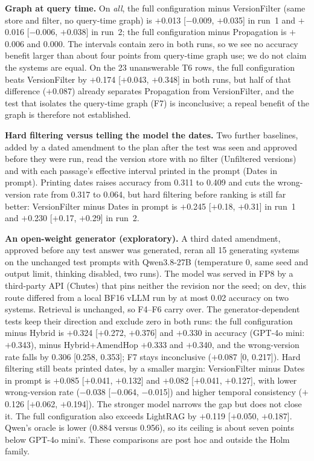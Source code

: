 \documentclass[conference]{IEEEtran}
\newcommand{\sys}[1]{\textsf{#1}}
\begin{document}
\textbf{Graph at query time.} On \textit{all}, the full configuration minus \sys{VersionFilter} (same store and filter, no query-time graph) is $+$0.013 [$-$0.009, $+$0.035] in run~1 and $+$0.016 [$-$0.006, $+$0.038] in run~2; the full configuration minus \sys{Propagation} is $+$0.006 and 0.000. The intervals contain zero in both runs, so we see no accuracy benefit larger than about four points from query-time graph use; we do not claim the systems are equal. On the 23 unanswerable T6 rows, the full configuration beats \sys{VersionFilter} by $+$0.174 [$+$0.043, $+$0.348] in both runs, but half of that difference ($+$0.087) already separates \sys{Propagation} from \sys{VersionFilter}, and the test that isolates the query-time graph (F7) is inconclusive; a repeal benefit of the graph is therefore not established.

\textbf{Hard filtering versus telling the model the dates.} Two further baselines, added by a dated amendment to the plan after the test was seen and approved before they were run, read the version store with no filter (\sys{Unfiltered versions}) and with each passage's effective interval printed in the prompt (\sys{Dates in prompt}). Printing dates raises accuracy from 0.311 to 0.409 and cuts the wrong-version rate from 0.317 to 0.064, but hard filtering before ranking is still far better: \sys{VersionFilter} minus \sys{Dates in prompt} is $+$0.245 [$+$0.18, $+$0.31] in run~1 and $+$0.230 [$+$0.17, $+$0.29] in run~2.

\textbf{An open-weight generator (exploratory).}\label{sec:qwen} A third dated amendment, approved before any test answer was generated, reran all 15 generating systems on the unchanged test prompts with Qwen3.8-27B (temperature 0, same seed and output limit, thinking disabled, two runs). The model was served in FP8 by a third-party API (Chutes) that pins neither the revision nor the seed; on dev, this route differed from a local BF16 vLLM run by at most 0.02 accuracy on two systems. Retrieval is unchanged, so F4--F6 carry over. The generator-dependent tests keep their direction and exclude zero in both runs: the full configuration minus \sys{Hybrid} is $+$0.324 [$+$0.272, $+$0.376] and $+$0.330 in accuracy (GPT-4o mini: $+$0.343), minus \sys{Hybrid+AmendHop} $+$0.333 and $+$0.340, and the wrong-version rate falls by 0.306 [0.258, 0.353]; F7 stays inconclusive ($+$0.087 [0, 0.217]). Hard filtering still beats printed dates, by a smaller margin: \sys{VersionFilter} minus \sys{Dates in prompt} is $+$0.085 [$+$0.041, $+$0.132] and $+$0.082 [$+$0.041, $+$0.127], with lower wrong-version rate ($-$0.038 [$-$0.064, $-$0.015]) and higher temporal consistency ($+$0.126 [$+$0.062, $+$0.194]). The stronger model narrows the gap but does not close it. The full configuration also exceeds LightRAG by $+$0.119 [$+$0.050, $+$0.187]. Qwen's oracle is lower (0.884 versus 0.956), so its ceiling is about seven points below GPT-4o mini's. These comparisons are post hoc and outside the Holm family.
\end{document}
